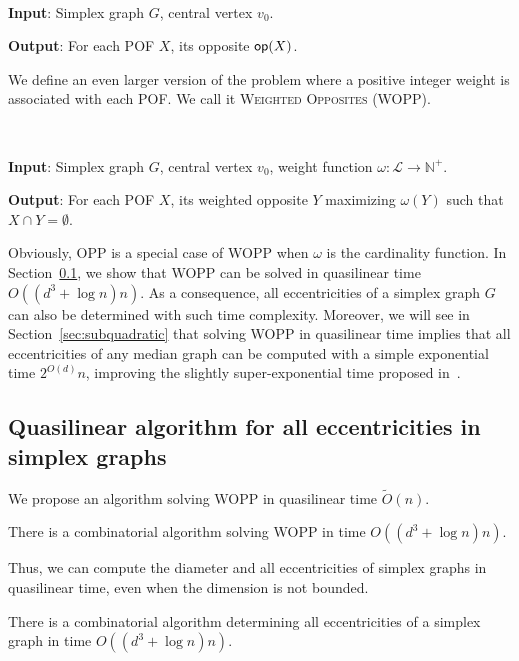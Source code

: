 \documentclass[a4paper,UKenglish,numberwithinsect,cleveref, autoref]{lipics-v2021}
\newcommand{\opp}{\mbox{\textsf{op}}}
\begin{document}
\begin{definition}[OPP]~

\textbf{Input}: Simplex graph $G$, central vertex $v_0$.

\textbf{Output}: For each POF $X$, its opposite $\opp(X)$.
\label{def:dpp}
\end{definition}

We define an even larger version of the problem where a positive integer weight is associated with each POF. We call it \textsc{Weighted Opposites} (WOPP).

\begin{definition}[WOPP]~

\textbf{Input}: Simplex graph $G$, central vertex $v_0$, weight function $\omega : \mathcal{L} \rightarrow \mathbb{N}^+$.

\textbf{Output}: For each POF $X$, its weighted opposite $Y$ maximizing $\omega(Y)$ such that $X \cap Y = \emptyset$.
\label{def:wdpp}
\end{definition}

Obviously, OPP is a special case of WOPP when $\omega$ is the cardinality function. In Section~\ref{subsec:partitioning}, we show that WOPP can be solved in quasilinear time $O((d^3+\log n)n)$. As a consequence, all eccentricities of a simplex graph $G$ can also be determined with such time complexity. Moreover, we will see in Section~\ref{sec:subquadratic} that solving WOPP in quasilinear time implies that all eccentricities of any median graph can be computed with a simple exponential time $2^{O(d)}n$, improving the slightly super-exponential time proposed in~\cite{BeHa21}.

\subsection{Quasilinear algorithm for all eccentricities in simplex graphs} \label{subsec:partitioning}

We propose an algorithm solving WOPP in quasilinear time $\tilde{O}(n)$. 

\begin{theorem}
There is a combinatorial algorithm solving WOPP in time $O((d^3+\log n)n)$. 
\label{th:solving_wopp}
\end{theorem}

Thus, we can compute the diameter and all eccentricities of simplex graphs in quasilinear time, even when the dimension is not bounded.

\begin{corollary}
There is a combinatorial algorithm determining all eccentricities of a simplex graph in time $O((d^3+\log n)n)$.
\label{co:linear_simplex}
\end{corollary}
\end{document}

